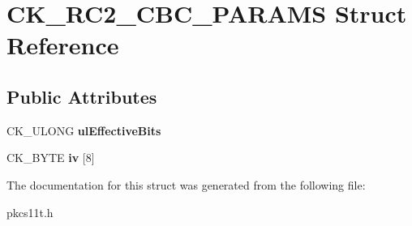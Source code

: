 \hypertarget{struct_c_k___r_c2___c_b_c___p_a_r_a_m_s}{}\section{C\+K\+\_\+\+R\+C2\+\_\+\+C\+B\+C\+\_\+\+P\+A\+R\+A\+MS Struct Reference}
\label{struct_c_k___r_c2___c_b_c___p_a_r_a_m_s}
\subsection*{Public Attributes}
\begin{DoxyCompactItemize}
\item 
\mbox{\label{struct_c_k___r_c2___c_b_c___p_a_r_a_m_s_aad0053a19c1f9bf50d50a5f2390832c3}} 
C\+K\+\_\+\+U\+L\+O\+NG {\bfseries ul\+Effective\+Bits}
\item 
\mbox{\label{struct_c_k___r_c2___c_b_c___p_a_r_a_m_s_ae1a967f8d5312ef0705687af3237231c}} 
C\+K\+\_\+\+B\+Y\+TE {\bfseries iv} \mbox{[}8\mbox{]}
\end{DoxyCompactItemize}


The documentation for this struct was generated from the following file\+:\begin{DoxyCompactItemize}
\item 
pkcs11t.\+h\end{DoxyCompactItemize}
